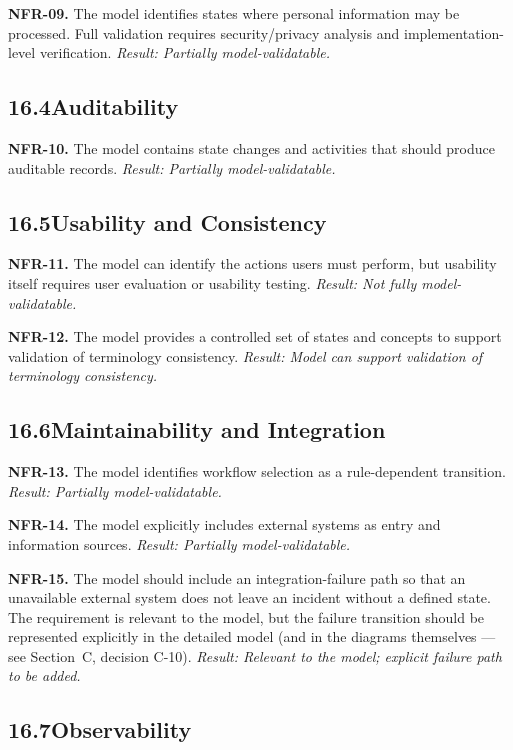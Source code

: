 \documentclass[11pt,a4paper]{article}
\begin{document}
\textbf{NFR-09.} The model identifies states where personal information may be processed. Full validation requires security/privacy analysis and implementation-level verification. \textit{Result: Partially model-validatable.}

\subsection*{16.4\enspace Auditability}

\textbf{NFR-10.} The model contains state changes and activities that should produce auditable records. \textit{Result: Partially model-validatable.}

\subsection*{16.5\enspace Usability and Consistency}

\textbf{NFR-11.} The model can identify the actions users must perform, but usability itself requires user evaluation or usability testing. \textit{Result: Not fully model-validatable.}

\textbf{NFR-12.} The model provides a controlled set of states and concepts to support validation of terminology consistency. \textit{Result: Model can support validation of terminology consistency.}

\subsection*{16.6\enspace Maintainability and Integration}

\textbf{NFR-13.} The model identifies workflow selection as a rule-dependent transition. \textit{Result: Partially model-validatable.}

\textbf{NFR-14.} The model explicitly includes external systems as entry and information sources. \textit{Result: Partially model-validatable.}

\textbf{NFR-15.} The model should include an integration-failure path so that an unavailable external system does not leave an incident without a defined state. The requirement is relevant to the model, but the failure transition should be represented explicitly in the detailed model (and in the diagrams themselves — see Section~C, decision C-10). \textit{Result: Relevant to the model; explicit failure path to be added.}

\subsection*{16.7\enspace Observability}
\end{document}

